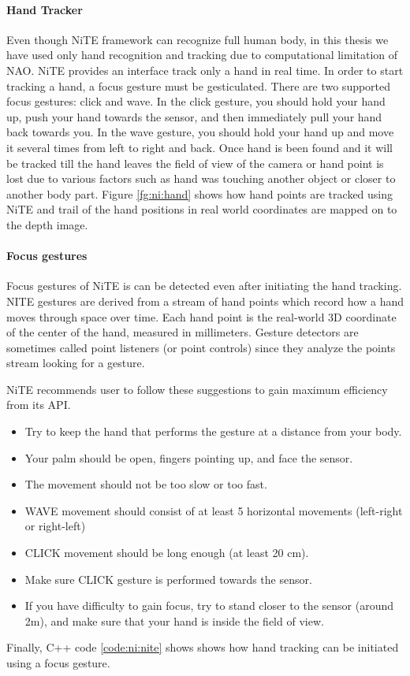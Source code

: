 \paragraph*{Hand Tracker} Even though NiTE framework can recognize full human body, in this thesis we have used only hand recognition and tracking due to computational limitation of NAO. NiTE provides an interface track only a hand in real time. In order to start tracking a hand, a focus gesture must be gesticulated. There are two supported focus gestures: click and wave. In the click gesture, you should hold your hand up, push your hand towards the sensor, and then immediately pull your hand back towards you. In the wave gesture, you should hold your hand up and move it several times from left to right and back. Once hand is been found and it will be tracked till the hand leaves the field of view of the camera or hand point is lost due to various factors such as hand was touching another object or closer to another body part. Figure \ref{fg:ni:hand} shows how hand points are tracked using NiTE and trail of the hand positions in real world coordinates are mapped on to the depth image.



\paragraph*{Focus gestures} Focus gestures of NiTE is can be detected even after initiating the hand tracking. NITE gestures are derived from a stream of hand points which record how a hand moves through space over time. Each hand point is the real-world 3D coordinate of the center of the hand, measured in millimeters. Gesture detectors are sometimes called point listeners (or point controls) since they analyze the points stream looking for a gesture. 

NiTE recommends user to follow these suggestions to gain maximum efficiency from its API. 
\begin{itemize}
	\item Try to keep the hand that performs the gesture at a distance from your body. 
	\item Your palm should be open, fingers pointing up, and face the sensor. 
	\item The movement should not be too slow or too fast. 
	\item WAVE movement should consist of at least 5 horizontal movements (left-right or right-left) 
	\item CLICK movement should be long enough (at least 20 cm). 
	\item Make sure CLICK gesture is performed towards the sensor. 
	\item If you have difficulty to gain focus, try to stand closer to the sensor (around 2m), and make sure that your hand is inside the field of view. 
\end{itemize}

Finally, C++ code \ref{code:ni:nite} shows shows how hand tracking can be initiated using a focus gesture. 

 \label{code:ni:nite}